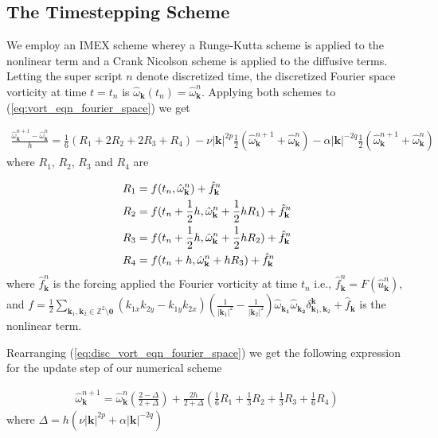 \documentclass[9pt]{article}
\newcommand{\uhat}[1]{\hat{u}_{#1}}      				          %
\newcommand{\omegahat}[1]{\hat{\omega}_{ \mathbf{#1} } }								%
\newcommand{\bfk}{\mathbf{k}}								%
\newcommand{\bfkn}[1]{\mathbf{k}_{#1}}								%
\begin{document}
\subsection{The Timestepping Scheme}

We employ an IMEX scheme wherey a Runge-Kutta scheme is applied to the nonlinear term and a Crank Nicolson scheme is applied to the diffusive terms. Letting the super script $n$ denote discretized time, the discretized Fourier space vorticity at time $t = t_n$ is $\omegahat{\bfk}(t_n) = \omegahat{\bfk}^n$. Applying both schemes to (\ref{eq:vort_eqn_fourier_space}) we get 

\begin{align}
	\frac{\omegahat{\bfk}^{n + 1} - \omegahat{\bfk}^n}{h} = \frac{1}{6}\left(R_1 + 2 R_2 + 2 R_3 + R_4\right) - \nu |\bfk|^{2p}\frac{1}{2}(\omegahat{\bfk}^{n + 1} + \omegahat{\bfk}^{n}) - \alpha|\bfk|^{-2q}\frac{1}{2}(\omegahat{\bfk}^{n + 1} + \omegahat{\bfk}^{n})
	\label{eq:disc_vort_eqn_fourier_space}
\end{align}
where $R_1$, $R_2$, $R_3$ and $R_4$ are 

\begin{align}
R_1 &= f(t_n, \omegahat{\bfk}^{n}) + \hat{f}_{\bfk}^{n} \notag \\
R_2 &= f(t_n + \frac{1}{2}h, \omegahat{\bfk}^{n} + \frac{1}{2}hR_1) + \hat{f}_{\bfk}^{n}\notag \\
R_3 &= f(t_n + \frac{1}{2}h, \omegahat{\bfk}^{n} + \frac{1}{2}hR_2) + \hat{f}_{\bfk}^{n}\notag \\
R_4 &= f(t_n + h, \omegahat{\bfk}^{n} + hR_3) + \hat{f}_{\bfk}^{n}
\end{align}
where $\hat{f}_{\bfk}^{n}$ is the forcing applied the Fourier vorticity at time $t_n$ i.e., $\hat{f}_{\bfk}^{n} = F(\uhat{\bfk}^{n})$, and  $f = \frac{1}{2}	\sum_{\mathbf{k}_1, \mathbf{k}_2\in \mathbb{Z}^2\setminus \mathbf{0}}\left(k_{1x}k_{2y} - k_{1y}k_{2x}\right) \left(\frac{1}{|\bfkn{1}|^2} - \frac{1}{|\bfkn{2}|^2}\right) \omegahat{\bfkn{1}}\omegahat{\bfkn{2}} \delta_{\bfkn{1}, \bfkn{2}}^{\bfk} + \hat{f}_\bfk$ is the nonlinear term.

Rearranging (\ref{eq:disc_vort_eqn_fourier_space}) we get the following expression for the update step of our numerical scheme

\begin{align}
\omegahat{\bfk}^{n + 1} = \omegahat{\bfk}^{n} \left(\frac{2 - \Delta}{2 + \Delta}\right) + \frac{2 h}{2 + \Delta}\left(\frac{1}{6}R_1 + \frac{1}{3}R_2  + \frac{1}{3}R_3 + \frac{1}{6}R_4\right)
\end{align}
where $\Delta = h \left(\nu|\bfk|^{2p} + \alpha|\bfk|^{-2q}\right)$
\end{document}
